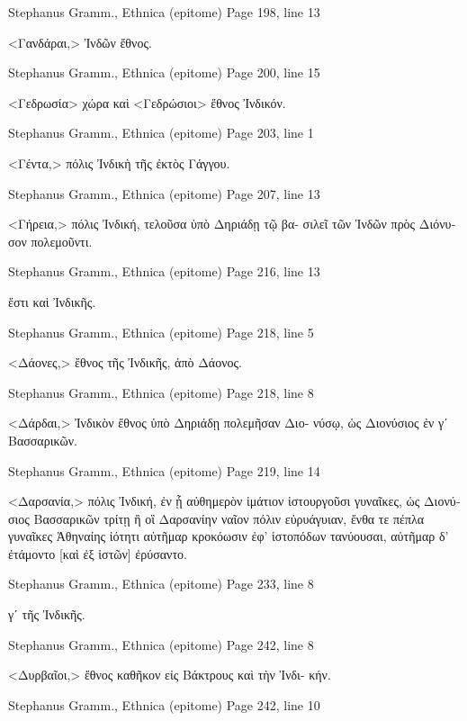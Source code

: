 \documentclass[12pt,letterpaper,twoside,final]{memoir}
\begin{document}
\begin{greek}
Stephanus Gramm., Ethnica (epitome) 
Page 198, line 13

<Γανδάραι,> Ἰνδῶν ἔθνος. 



Stephanus Gramm., Ethnica (epitome) 
Page 200, line 15

<Γεδρωσία> χώρα καὶ <Γεδρώσιοι> ἔθνος Ἰνδικόν. 



Stephanus Gramm., Ethnica (epitome) 
Page 203, line 1

<Γέντα,> πόλις Ἰνδικὴ τῆς ἐκτὸς Γάγγου. 



Stephanus Gramm., Ethnica (epitome) 
Page 207, line 13

<Γήρεια,> πόλις Ἰνδική, τελοῦσα ὑπὸ Δηριάδῃ τῷ βα-
σιλεῖ τῶν Ἰνδῶν πρὸς Διόνυσον πολεμοῦντι. 



Stephanus Gramm., Ethnica (epitome) 
Page 216, line 13

                               ἔστι καὶ Ἰνδικῆς. 



Stephanus Gramm., Ethnica (epitome) 
Page 218, line 5

<Δάονες,> ἔθνος τῆς Ἰνδικῆς, ἀπὸ Δάονος. 



Stephanus Gramm., Ethnica (epitome) 
Page 218, line 8

<Δάρδαι,> Ἰνδικὸν ἔθνος ὑπὸ Δηριάδῃ πολεμῆσαν Διο-
νύσῳ, ὡς Διονύσιος ἐν γʹ Βασσαρικῶν. 



Stephanus Gramm., Ethnica (epitome) 
Page 219, line 14

<Δαρσανία,> πόλις Ἰνδική, ἐν ᾗ αὐθημερὸν ἱμάτιον 
ἱστουργοῦσι γυναῖκες, ὡς Διονύσιος Βασσαρικῶν τρίτῃ   
  ἢ οἳ Δαρσανίην ναῖον πόλιν εὐρυάγυιαν, 
  ἔνθα τε πέπλα γυναῖκες Ἀθηναίης ἰότητι 
  αὐτῆμαρ κροκόωσιν ἐφ' ἱστοπόδων τανύουσαι, 
  αὐτῆμαρ δ' ἐτάμοντο [καὶ ἐξ ἱστῶν] ἐρύσαντο. 



Stephanus Gramm., Ethnica (epitome) 
Page 233, line 8

γʹ τῆς Ἰνδικῆς. 



Stephanus Gramm., Ethnica (epitome) 
Page 242, line 8

<Δυρβαῖοι,> ἔθνος καθῆκον εἰς Βάκτρους καὶ τὴν Ἰνδι-
κήν. 



Stephanus Gramm., Ethnica (epitome) 
Page 242, line 10


\end{greek}
\end{document}
